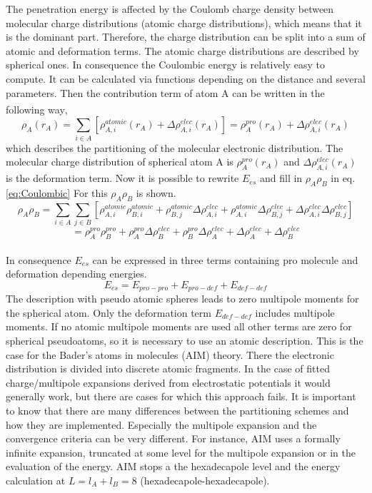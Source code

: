 \documentclass[a4paper,11pt]{scrartcl}
\newcommand{\myCite}[1]{\textsuperscript{\cite{#1}}}
\begin{document}
The penetration energy is affected by the Coulomb charge density
between molecular charge distributions (atomic charge distributions),
which means that it is the dominant part. Therefore, the charge distribution
can be split into a sum of atomic and deformation terms. The atomic
charge distributions are described by spherical ones. In consequence
the Coulombic energy is relatively easy to compute. It can be calculated
via functions depending on the distance and several parameters. Then
the contribution term of atom A can be written in the following way\myCite{Spackman1986a},
\begin{equation}
\rho_{A}(r_{A})=\sum_{i\in A}[\rho_{A,i}^{atomic}(r_{A})+\Delta\rho_{A,i}^{elec}(r_{A})]=\rho_{A}^{pro}(r_{A})+\Delta\rho_{A,i}^{elec}(r_{A})
\end{equation}
which describes the partitioning of the molecular electronic distribution.
The molecular charge distribution of spherical atom A is $\rho_{A}^{pro}(r_{A})$
and $\Delta\rho_{A,i}^{elec}(r_{A})$ is the deformation term. Now
it is possible to rewrite $E_{es}$ and fill in $\rho_{A}\rho_{B}$
in eq. \ref{eq:Coulombic} For this $\rho_{A}\rho_{B}$ is shown.
\[
\rho_{A}\rho_{B}=\sum_{i\in A}\sum_{j\in B}[\rho_{A,i}^{atomic}\rho_{B,i}^{atomic}+\rho_{B,j}^{atomic}\Delta\rho_{A,i}^{elec}+\rho_{A,i}^{atomic}\Delta\rho_{B,j}^{elec}+\Delta\rho_{A,i}^{elec}\Delta\rho_{B,j}^{elec}]
\]
\begin{equation}
=\rho_{A}^{pro}\rho_{B}^{pro}+\rho_{A}^{pro}\Delta\rho_{B}^{elec}+\rho_{B}^{pro}\Delta\rho_{A}^{elec}+\Delta\rho_{A}^{elec}+\Delta\rho_{B}^{elec}
\end{equation}
\\
In consequence $E_{es}$ can be expressed in three terms containing
pro molecule and deformation depending energies.
\begin{equation}
E_{es}=E_{pro-pro}+E_{pro-def}+E_{def-def}\label{Ees}
\end{equation}
The description with pseudo atomic spheres leads to zero multipole
moments for the spherical atom. Only the deformation term $E_{def-def}$
includes multipole moments. If no atomic multipole moments are used
all other terms are zero for spherical pseudoatoms, so it is necessary
to use an atomic description. This is the case for the Bader's atoms
in molecules (AIM) theory. There the electronic distribution is divided
into discrete atomic fragments. In the case of fitted charge/multipole
expansions derived from electrostatic potentials it would generally
work, but there are cases for which this approach fails. It is important
to know that there are many differences between the partitioning schemes
and how they are implemented. Especially the multipole expansion and
the convergence criteria can be very different. For instance, AIM
uses a formally infinite expansion, truncated at some level for the
multipole expansion or in the evaluation of the energy. AIM stops
a the hexadecapole level and the energy calculation at $L=l_{A}+l_{B}=8$
(hexadecapole-hexadecapole).
\end{document}
